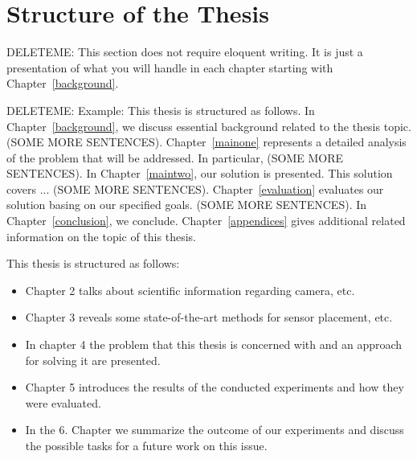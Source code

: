 \section{Structure of the Thesis}
DELETEME: This section does not require eloquent writing. It is just a presentation of what you will handle in each chapter starting with Chapter~\ref{background}.

DELETEME: Example: This thesis is structured as follows. In Chapter~\ref{background}, we discuss essential background related to the thesis topic. (SOME MORE SENTENCES). Chapter~\ref{mainone} represents a detailed analysis of the problem that will be addressed. In particular, (SOME MORE SENTENCES). In Chapter~\ref{maintwo}, our solution is presented. This solution covers ... (SOME MORE SENTENCES). Chapter~\ref{evaluation} evaluates our solution basing on our specified goals. (SOME MORE SENTENCES). In Chapter~\ref{conclusion}, we conclude. Chapter~\ref{appendices} gives additional related information on the topic of this thesis.

This thesis is structured as follows: 
\begin{itemize}
    \item Chapter 2 talks about scientific information regarding camera, etc.
    \item Chapter 3 reveals some state-of-the-art methods for sensor placement, etc.
    \item In chapter 4 the problem that this thesis is concerned with and an approach for solving it are presented.
    \item Chapter 5 introduces the results of the conducted experiments and how they were evaluated.
    \item In the 6. Chapter we summarize the outcome of our experiments and discuss the possible tasks for a future work on this issue.
\end{itemize} 
